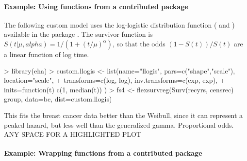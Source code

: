 \documentclass[nojss,nofooter]{jss}
\begin{document}
\paragraph{Example: Using functions from a contributed package}

The following custom model uses the log-logistic distribution function
( and ) available in the package
.   The survivor function is $S(t|\mu,alpha) = 1/(1 + (t/\mu)^\alpha)$,
so that the odds $(1-S(t))/S(t)$ are a linear function of log time.
\begin{Schunk}
\begin{Sinput}
> library(eha)
> custom.llogis <- list(name="llogis",  pars=c("shape","scale"), location="scale",
+                       transforms=c(log, log), inv.transforms=c(exp, exp),
+                       inits=function(t){ c(1, median(t)) })
> fs4 <- flexsurvreg(Surv(recyrs, censrec) ~ group, data=bc, dist=custom.llogis)
\end{Sinput}
\end{Schunk}

This fits the breast cancer data better than the Weibull, since it can
represent a peaked hazard, but less well than the generalized gamma.
Proportional odds.  ANY SPACE FOR A HIGHLIGHTED PLOT



\paragraph{Example: Wrapping functions from a contributed package}
\end{document}
